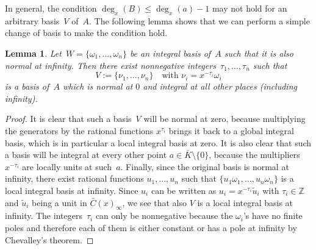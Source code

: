 \documentclass{sig-alternate-05-2015}
\newtheorem{lemma}[theorem]{Lemma}
\let\set\mathbb
\begin{document}
In general, the condition $\deg_x(B) \leq \deg_x(a)-1$ may not hold for an arbitrary basis~$V$ of~$A$.
The following lemma shows that we can perform a simple change of basis to make the condition hold.

\begin{lemma}\label{LM:CB}
Let~$W =\{\omega_1, \ldots, \omega_n\}$ be an integral basis of~$A$ such that it is also normal at infinity. Then
there exist nonnegative integers~$\tau_1, \ldots, \tau_n$ such that
\[ V := \{\nu_1, \ldots, \nu_n\} \quad \text{with $\nu_i = x^{-\tau_i} \omega_i$}\]
is a basis of~$A$ which is normal at $0$ and integral at all other places (including infinity).
\end{lemma}
\begin{proof}
It is clear that such a basis~$V$ will be normal at zero, because multiplying the generators by
the rational functions $x^{\tau_i}$ brings it back to a global integral basis, which is in particular
a local integral basis at zero.
It is also clear that such a basis will be integral at every other point $a\in\bar K\setminus\{0\}$, because the
multipliers $x^{-\tau_i}$ are locally units at such~$a$.
Finally, since the original basis is normal at infinity, there exist rational functions $u_1,\dots,u_n$
such that $\{u_1\omega_1,\dots,u_n\omega_n\}$ is a local integral basis at infinity.
Since $u_i$ can be written as $u_i=x^{-\tau_i}\tilde{u}_i$ with $\tau_i\in\set Z$ and $\tilde{u}_i$ being a unit
in $\bar{C}(x)_\infty$, we see that also $V$ is a local integral basis at infinity.
The integers~$\tau_i$ can only be nonnegative because the $\omega_i$'s have no finite poles and therefore each
of them is either constant or has a pole at infinity by Chevalley's theorem.
\end{proof}
\end{document}
